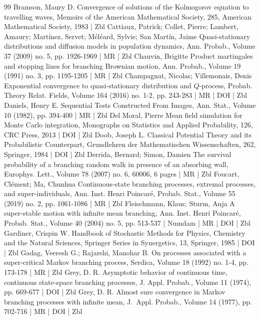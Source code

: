 \documentclass[10pt]{amsart}
\theoremstyle{definition}\newtheorem{defi}[theo]{Definition}\newtheorem{rema}[theo]{Remark}\newtheorem{exam}[theo]{Example}\newtheorem{exem}[theo]{Example}\newtheorem{nota}[theo]{Notation}
\newcommand{\1} {\mathds{1}}
\begin{document}
\begin{thebibliography}{99}
Bramson, Maury D. Convergence of solutions of the Kolmogorov equation to travelling waves, Memoirs of the American Mathematical Society, 285, American Mathematical Society, 1983 | Zbl
Cattiaux, Patrick; Collet, Pierre; Lambert, Amaury; Martínez, Servet; Méléard, Sylvie; San Martín, Jaime Quasi-stationary distributions and diffusion models in population dynamics, Ann. Probab., Volume 37 (2009) no. 5, pp. 1926-1969 | MR | Zbl
Chauvin, Brigitte Product martingales and stopping lines for branching Brownian motion, Ann. Probab., Volume 19 (1991) no. 3, pp. 1195-1205 | MR | Zbl
Champagnat, Nicolas; Villemonais, Denis Exponential convergence to quasi-stationary distribution and ${Q}$-process, Probab. Theory Relat. Fields, Volume 164 (2016) no. 1-2, pp. 243-283 | MR | DOI | Zbl
Daniels, Henry E. Sequential Tests Constructed From Images, Ann. Stat., Volume 10 (1982), pp. 394-400 | MR | Zbl
Del Moral, Pierre Mean field simulation for Monte Carlo integration, Monographs on Statistics and Applied Probability, 126, CRC Press, 2013 | DOI | Zbl
Doob, Joseph L. Classical Potential Theory and its Probabilistic Counterpart, Grundlehren der Mathematischen Wissenschaften, 262, Springer, 1984 | DOI | Zbl
Derrida, Bernard; Simon, Damien The survival probability of a branching random walk in presence of an absorbing wall, Europhys. Lett., Volume 78 (2007) no. 6, 60006, 6 pages | MR | Zbl
Foucart, Clément; Ma, Chunhua Continuous-state branching processes, extremal processes, and super-individuals, Ann. Inst. Henri Poincaré, Probab. Stat., Volume 55 (2019) no. 2, pp. 1061-1086 | MR | Zbl
Fleischmann, Klaus; Sturm, Anja A super-stable motion with infinite mean branching, Ann. Inst. Henri Poincaré, Probab. Stat., Volume 40 (2004) no. 5, pp. 513-537 | Numdam | MR | DOI | Zbl
Gardiner, Crispin W. Handbook of Stochastic Methods for Physics, Chemistry and the Natural Sciences, Springer Series in Synergetics, 13, Springer, 1985 | DOI | Zbl
Gadag, Veeresh G.; Rajarshi, Manohar B. On processes associated with a super-critical Markov branching process, Serdica, Volume 18 (1992) no. 1-4, pp. 173-178 | MR | Zbl
Grey, D. R. Asymptotic behavior of continuous time, continuous state-space branching processes, J. Appl. Probab., Volume 11 (1974), pp. 669-677 | DOI | Zbl
Grey, D. R. Almost sure convergence in Markov branching processes with infinite mean, J. Appl. Probab., Volume 14 (1977), pp. 702-716 | MR | DOI | Zbl

\end{thebibliography}
\end{document}
